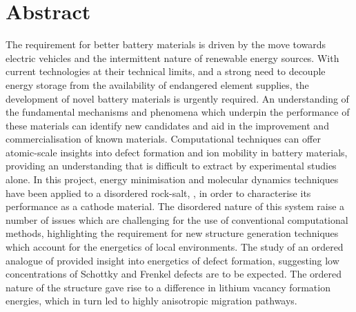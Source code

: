 \chapter*{Abstract}
The requirement for better battery materials is driven by the move towards electric vehicles and the intermittent nature of renewable energy sources.
With current technologies at their technical limits, and a strong need to decouple energy storage from the availability of endangered element supplies, the development of novel battery materials is urgently required.
An understanding of the fundamental mechanisms and phenomena which underpin the performance of these materials can identify new candidates and aid in the improvement and commercialisation of known materials.
Computational techniques can offer atomic-scale insights into defect formation and ion mobility in battery materials, providing an understanding that is difficult to extract by experimental studies alone.
In this project, energy minimisation and molecular dynamics techniques have been applied to a disordered rock-salt, , in order to characterise its performance as a cathode material.
The disordered nature of this system raise a number of issues which are challenging for the use of conventional computational methods, highlighting the requirement for new structure generation techniques which account for the energetics of local environments.
The study of an ordered analogue of  provided insight into energetics of defect formation, suggesting low concentrations of Schottky and Frenkel defects are to be expected.
The ordered nature of the structure gave rise to a difference in lithium vacancy formation energies, which in turn led to highly anisotropic migration pathways.
